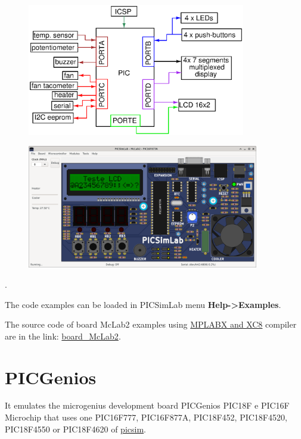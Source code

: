 \begin{figure}[H]
\center
\includegraphics[width=0.85\textwidth]{img/blocks_p3.eps} 
\end{figure} 


\begin{figure}[H]
\center
\includegraphics[width=0.9\textwidth]{img/picsimlab3.png} 
\end{figure} 

.\vspace{0.5cm}

The code examples can be loaded in PICSimLab menu \textbf{Help->Examples}.

The source code of board McLab2 examples using \href{http://www.microchip.com/mplabx}{MPLABX and XC8} 
compiler are in the link: \href{https://lcgamboa.github.io/picsimlab_examples/board_McLab2.html}{board\_McLab2}.

\section{PICGenios}

It emulates the microgenius development board PICGenios PIC18F e PIC16F Microchip that uses one PIC16F777, PIC16F877A, PIC18F452, PIC18F4520, PIC18F4550 or PIC18F4620 of \href{https://github.com/lcgamboa/picsim}{picsim}.

